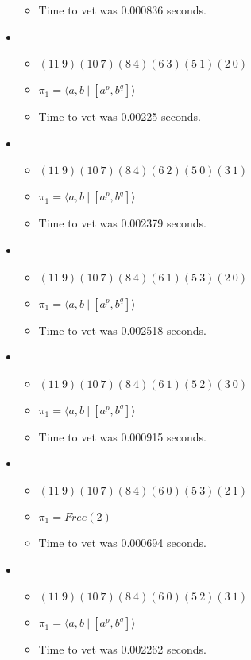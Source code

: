\documentclass{article}
\begin{document}
\begin{itemize}
\begin{itemize}
      \item Time to vet was 0.000836 seconds.
\end{itemize}
\item \begin{itemize}
      \item $(11\ 9)(10\ 7)(8\ 4)(6\ 3)(5\ 1)(2\ 0)$
      \item $\pi_1 = \langle a,b\ |\ [a^p,b^q]\rangle$
      \item Time to vet was 0.00225 seconds.
\end{itemize}
\item \begin{itemize}
      \item $(11\ 9)(10\ 7)(8\ 4)(6\ 2)(5\ 0)(3\ 1)$
      \item $\pi_1 = \langle a,b\ |\ [a^p,b^q]\rangle$
      \item Time to vet was 0.002379 seconds.
\end{itemize}
\item \begin{itemize}
      \item $(11\ 9)(10\ 7)(8\ 4)(6\ 1)(5\ 3)(2\ 0)$
      \item $\pi_1 = \langle a,b\ |\ [a^p,b^q]\rangle$
      \item Time to vet was 0.002518 seconds.
\end{itemize}
\item \begin{itemize}
      \item $(11\ 9)(10\ 7)(8\ 4)(6\ 1)(5\ 2)(3\ 0)$
      \item $\pi_1 = \langle a,b\ |\ [a^p,b^q]\rangle$
      \item Time to vet was 0.000915 seconds.
\end{itemize}
\item \begin{itemize}
      \item $(11\ 9)(10\ 7)(8\ 4)(6\ 0)(5\ 3)(2\ 1)$
      \item $\pi_1 =Free(2)$
      \item Time to vet was 0.000694 seconds.
\end{itemize}
\item \begin{itemize}
      \item $(11\ 9)(10\ 7)(8\ 4)(6\ 0)(5\ 2)(3\ 1)$
      \item $\pi_1 = \langle a,b\ |\ [a^p,b^q]\rangle$
      \item Time to vet was 0.002262 seconds.

\end{itemize}
\end{itemize}
\end{document}

